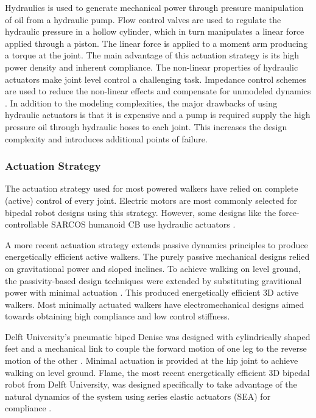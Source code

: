 Hydraulics is used to generate mechanical power through pressure manipulation of oil from a hydraulic pump. Flow control valves are used to regulate the hydraulic pressure in a hollow cylinder, which in turn manipulates a linear force applied through a piston. The linear force is applied to a moment arm producing a torque at the joint. The main advantage of this actuation strategy is its high power density and inherent compliance. The non-linear properties of hydraulic actuators make joint level control a challenging task. Impedance control schemes are used to reduce the non-linear effects and compensate for unmodeled dynamics \cite{Bilodeau1998}. In addition to the modeling complexities, the major drawbacks of using hydraulic actuators is that it is expensive and a pump is required supply the high pressure oil through hydraulic hoses to each joint. This increases the design complexity and introduces additional points of failure.

\subsubsection{Actuation Strategy} %
\label{ssub:actuation_strategy}
The actuation strategy used for most powered walkers have relied on complete (active) control of every joint. Electric motors are most commonly selected for bipedal robot designs using this strategy. However, some designs like the force-controllable SARCOS humanoid CB use hydraulic actuators \cite{SangHoHyon:2007jy}. 

A more recent actuation strategy extends passive dynamics principles to produce energetically efficient active walkers. The purely passive mechanical designs relied on gravitational power and sloped inclines. To achieve walking on level ground, the passivity-based design techniques were extended by substituting gravitional power with minimal actuation \cite{Spong:1999vk,Collins:2005vp}. This produced energetically efficient 3D active walkers. Most minimally actuated walkers have electromechanical designs aimed towards obtaining high compliance and low control stiffness.  

Delft University's pneumatic biped Denise was designed with cylindrically shaped feet and a mechanical link to couple the forward motion of one leg to the reverse motion of the other \cite{Anderson:2005cw}. Minimal actuation is provided at the hip joint to achieve walking on level ground. Flame, the most recent energetically efficient 3D bipedal robot from Delft University, was designed specifically to take advantage of the natural dynamics of the system \cite{Hobbelen2008} using series elastic actuators (SEA) for compliance \cite{Pratt1995}. 

